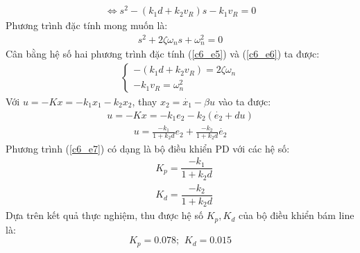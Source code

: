           \begin{align}
               \Leftrightarrow s^2 - (k_1d + k_2v_R)s - k_1v_R = 0
               \label{c6_e5}
          \end{align}
          \hspace*{0.6cm}Phương trình đặc tính mong muốn là:
          \begin{align}
               s^2 + 2\zeta\omega_ns + \omega_n^2 = 0 
               \label{c6_e6}
          \end{align}
          \hspace*{0.6cm}Cân bằng hệ số hai phương trình đặc tính (\ref{c6_e5}) và (\ref{c6_e6}) ta được:
          \begin{align*}
               \begin{cases}
               -(k_1d + k_2v_R) = 2\zeta\omega_n \\
               -k_1v_R = \omega_n^2
               \end{cases} 
          \end{align*}
          \hspace*{0.6cm}Với $u = -Kx = -k_1x_1 - k_2x_2$, thay $x_2 = \dot{x_1} - \beta u$ vào ta được:
          \begin{align*}
               u = -Kx = -k_1e_2 - k_2(\dot{e_2} + du)
          \end{align*}
          \begin{align}
               u = \frac{-k_1}{1 + k_2d}e_2 + \frac{-k_2}{1 + k_2d}\dot{e_2}
               \label{c6_e7}
          \end{align}
          \hspace*{0.6cm}Phương trình (\ref{c6_e7}) có dạng là bộ điều khiển PD với các hệ số:
          \begin{align*}  
               &K_p = \dfrac{-k_1}{1+k_2 d}\\
               &K_d = \dfrac{-k_2}{1 + k_2 d}
          \end{align*}
          \hspace*{0.6cm}Dựa trên kết quả thực nghiệm, thu được hệ số $K_p, K_d$ của bộ điều khiển bám line là:
          \begin{equation*}
               K_p = 0.078; \,\ K_d = 0.015
          \end{equation*}
